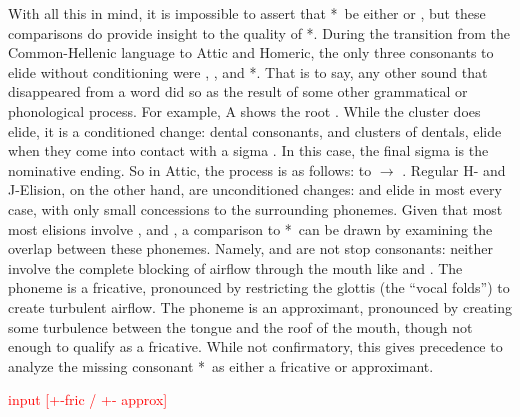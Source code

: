 With all this in mind, it is impossible to assert that *\w\ be either  or , but these comparisons do provide insight to the quality of *\w. During the transition from the Common-Hellenic language to Attic and Homeric, the only three consonants to elide without conditioning were , , and *\w. That is to say, any other sound that disappeared from a word did so as the result of some other grammatical or phonological process. For example, A  shows the root . While the cluster  does elide, it is a conditioned change: dental consonants, and clusters of dentals, elide when they come into contact with a sigma . In this case, the final sigma  is the nominative ending.  So in Attic, the process is as follows:  to  $\to$ . Regular H- and J-Elision, on the other hand, are unconditioned changes:  and  elide in most every case, with only small concessions to the surrounding phonemes. Given that most most elisions involve , and , a comparison to *\w\ can be drawn by examining the overlap between these phonemes. Namely,  and  are not stop consonants: neither involve the complete blocking of airflow through the mouth like  and . The phoneme  is a fricative, pronounced by restricting the glottis (the ``vocal folds'') to create turbulent airflow. The phoneme  is an approximant, pronounced by creating some turbulence between the tongue and the roof of the mouth, though not enough to qualify as a fricative. While not confirmatory, this gives precedence to analyze the missing consonant *\w\ as either a fricative or approximant.

\noindent\textcolor{red}{input [+-fric / +- approx]}
